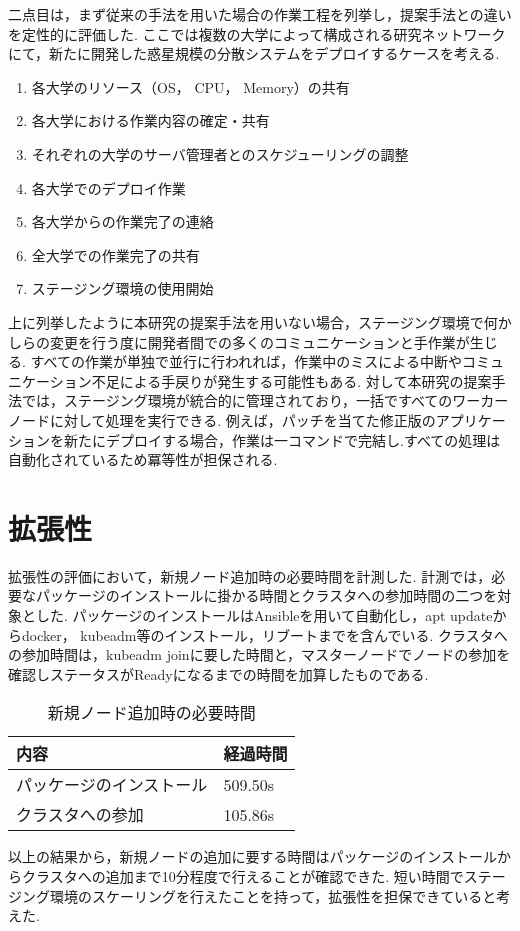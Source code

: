 二点目は，まず従来の手法を用いた場合の作業工程を列挙し，提案手法との違いを定性的に評価した.
ここでは複数の大学によって構成される研究ネットワークにて，新たに開発した惑星規模の分散システムをデプロイするケースを考える.

\begin{enumerate}
  \item 各大学のリソース（OS， CPU， Memory）の共有
  \item 各大学における作業内容の確定・共有
  \item それぞれの大学のサーバ管理者とのスケジューリングの調整
  \item 各大学でのデプロイ作業
  \item 各大学からの作業完了の連絡
  \item 全大学での作業完了の共有
  \item ステージング環境の使用開始
\end{enumerate}

上に列挙したように本研究の提案手法を用いない場合，ステージング環境で何かしらの変更を行う度に開発者間での多くのコミュニケーションと手作業が生じる.
すべての作業が単独で並行に行われれば，作業中のミスによる中断やコミュニケーション不足による手戻りが発生する可能性もある.
対して本研究の提案手法では，ステージング環境が統合的に管理されており，一括ですべてのワーカーノードに対して処理を実行できる.
例えば，パッチを当てた修正版のアプリケーションを新たにデプロイする場合，作業は一コマンドで完結し.すべての処理は自動化されているため冪等性が担保される.

\section{拡張性}
\label{evaluation:method}

拡張性の評価において，新規ノード追加時の必要時間を計測した.
計測では，必要なパッケージのインストールに掛かる時間とクラスタへの参加時間の二つを対象とした.
パッケージのインストールはAnsibleを用いて自動化し，apt updateからdocker， kubeadm等のインストール，リブートまでを含んでいる.
クラスタへの参加時間は，kubeadm joinに要した時間と，マスターノードでノードの参加を確認しステータスがReadyになるまでの時間を加算したものである.

\begin{table}[htb]
  \begin{center}
    \caption{新規ノード追加時の必要時間}
    \begin{tabular}{|l|l|} \hline
      内容 & 経過時間 \\ \hline
      パッケージのインストール & 509.50s \\ \hline
      クラスタへの参加 & 105.86s \\ \hline
    \end{tabular}
  \end{center}
\end{table}

以上の結果から，新規ノードの追加に要する時間はパッケージのインストールからクラスタへの追加まで10分程度で行えることが確認できた.
短い時間でステージング環境のスケーリングを行えたことを持って，拡張性を担保できていると考えた.

